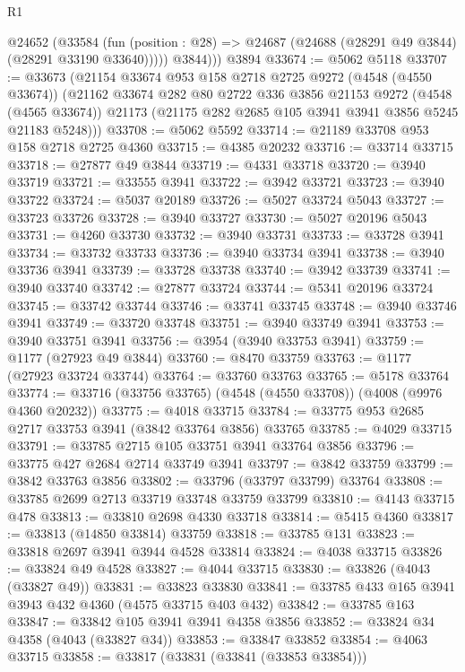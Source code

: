 \begin{lexlean}{R1}
\begin{coremodule}
        @24652
          (@33584
            (fun (position : @28) => @24687 (@24688 (@28291 @49 @3844) (@28291 @33190 @33640)))))
          @3844)))
    @3894
@33674 := @5062 @5118
@33707 := @33673
    (@21154
      @33674
      @953
      @158
      @2718
      @2725
      @9272
      (@4548 (@4550 @33674))
      (@21162
        @33674
        @282
        @80
        @2722
        @336
        @3856
        @21153
        @9272
        (@4548 (@4565 @33674))
        @21173
        (@21175 @282 @2685 @105 @3941 @3941 @3856 @5245 @21183 @5248)))
@33708 := @5062 @5592
@33714 := @21189 @33708 @953 @158 @2718 @2725 @4360
@33715 := @4385 @20232
@33716 := @33714 @33715
@33718 := @27877 @49 @3844
@33719 := @4331 @33718
@33720 := @3940 @33719
@33721 := @33555 @3941
@33722 := @3942 @33721
@33723 := @3940 @33722
@33724 := @5037 @20189
@33726 := @5027 @33724 @5043
@33727 := @33723 @33726
@33728 := @3940 @33727
@33730 := @5027 @20196 @5043
@33731 := @4260 @33730
@33732 := @3940 @33731
@33733 := @33728 @3941
@33734 := @33732 @33733
@33736 := @3940 @33734 @3941
@33738 := @3940 @33736 @3941
@33739 := @33728 @33738
@33740 := @3942 @33739
@33741 := @3940 @33740
@33742 := @27877 @33724
@33744 := @5341 @20196 @33724
@33745 := @33742 @33744
@33746 := @33741 @33745
@33748 := @3940 @33746 @3941
@33749 := @33720 @33748
@33751 := @3940 @33749 @3941
@33753 := @3940 @33751 @3941
@33756 := @3954 (@3940 @33753 @3941)
@33759 := @1177 (@27923 @49 @3844)
@33760 := @8470 @33759
@33763 := @1177 (@27923 @33724 @33744)
@33764 := @33760 @33763
@33765 := @5178 @33764
@33774 := @33716 (@33756 @33765) (@4548 (@4550 @33708)) (@4008 (@9976 @4360 @20232))
@33775 := @4018 @33715
@33784 := @33775 @953 @2685 @2717 @33753 @3941 (@3842 @33764 @3856) @33765
@33785 := @4029 @33715
@33791 := @33785 @2715 @105 @33751 @3941 @33764 @3856
@33796 := @33775 @427 @2684 @2714 @33749 @3941
@33797 := @3842 @33759
@33799 := @3842 @33763 @3856
@33802 := @33796 (@33797 @33799) @33764
@33808 := @33785 @2699 @2713 @33719 @33748 @33759 @33799
@33810 := @4143 @33715 @478
@33813 := @33810 @2698 @4330 @33718
@33814 := @5415 @4360
@33817 := @33813 (@14850 @33814) @33759
@33818 := @33785 @131
@33823 := @33818 @2697 @3941 @3944 @4528 @33814
@33824 := @4038 @33715
@33826 := @33824 @49 @4528
@33827 := @4044 @33715
@33830 := @33826 (@4043 (@33827 @49))
@33831 := @33823 @33830
@33841 := @33785 @433 @165 @3941 @3943 @432 @4360 (@4575 @33715 @403 @432)
@33842 := @33785 @163
@33847 := @33842 @105 @3941 @3941 @4358 @3856
@33852 := @33824 @34 @4358 (@4043 (@33827 @34))
@33853 := @33847 @33852
@33854 := @4063 @33715
@33858 := @33817 (@33831 (@33841 (@33853 @33854)))

\end{coremodule}
\end{lexlean}

